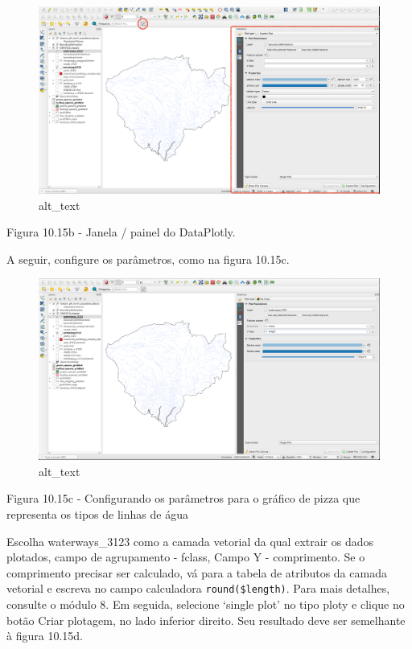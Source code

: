 \documentclass[
  portuguese,
]{krantz}
\begin{document}
\begin{figure}
\centering
\includegraphics{media/modulo10/fig1015_b.png}
\caption{alt\_text}
\end{figure}

Figura 10.15b - Janela / painel do DataPlotly.

A seguir, configure os parâmetros, como na figura 10.15c.

\begin{figure}
\centering
\includegraphics{media/modulo10/fig1015_c.png}
\caption{alt\_text}
\end{figure}

Figura 10.15c - Configurando os parâmetros para o gráfico de pizza que representa os tipos de linhas de água

Escolha waterways\_3123 como a camada vetorial da qual extrair os dados plotados, campo de agrupamento - fclass, Campo Y - comprimento. Se o comprimento precisar ser calculado, vá para a tabela de atributos da camada vetorial e escreva no campo calculadora \texttt{round(\$length)}. Para mais detalhes, consulte o módulo 8. Em seguida, selecione `single plot' no tipo ploty e clique no botão Criar plotagem, no lado inferior direito. Seu resultado deve ser semelhante à figura 10.15d.
\end{document}
